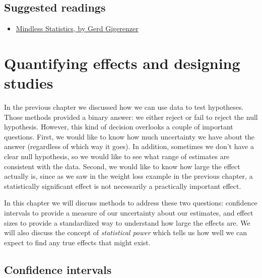 \documentclass[12pt,]{book}
\providecommand{\tightlist}{%
  \setlength{\itemsep}{0pt}\setlength{\parskip}{0pt}}
\theoremstyle{definition}
\theoremstyle{definition}
\theoremstyle{definition}
\theoremstyle{remark}
\begin{document}
\hypertarget{suggested-readings-6}{%
\section{Suggested readings}\label{suggested-readings-6}}

\begin{itemize}
\tightlist
\item
  \href{https://library.mpib-berlin.mpg.de/ft/gg/GG_Mindless_2004.pdf}{Mindless Statistics, by Gerd Gigerenzer}
\end{itemize}

\hypertarget{ci-effect-size-power}{%
\chapter{Quantifying effects and designing studies}\label{ci-effect-size-power}}

In the previous chapter we discussed how we can use data to test hypotheses. Those methods provided a binary answer: we either reject or fail to reject the null hypothesis. However, this kind of decision overlooks a couple of important questions. First, we would like to know how much uncertainty we have about the answer (regardless of which way it goes). In addition, sometimes we don't have a clear null hypothesis, so we would like to see what range of estimates are consistent with the data. Second, we would like to know how large the effect actually is, since as we saw in the weight loss example in the previous chapter, a statistically significant effect is not necessarily a practically important effect.

In this chapter we will discuss methods to address these two questions: confidence intervals to provide a measure of our uncertainty about our estimates, and effect sizes to provide a standardized way to understand how large the effects are. We will also discuss the concept of \emph{statistical power} which tells us how well we can expect to find any true effects that might exist.

\hypertarget{confidence-intervals-1}{%
\section{Confidence intervals}\label{confidence-intervals-1}}
\end{document}
